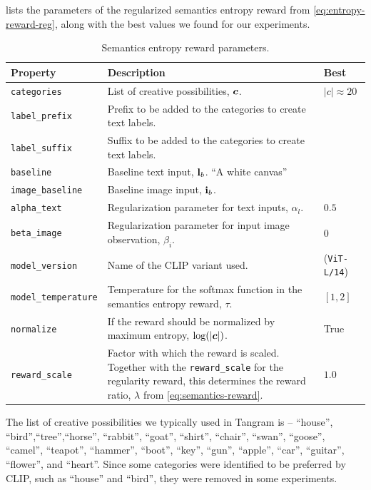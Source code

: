  lists the parameters of the regularized semantics entropy reward from \eqref{eq:entropy-reward-reg}, along with the best values we found for our experiments.
\begin{table}[H]
    \centering
    \caption{Semantics entropy reward parameters.}
    \begin{tabularx}{\textwidth}{C{3.9cm} L C{2cm}}
        \hline
        Property & Description & Best\\
        \hline
        \texttt{categories} & List of creative possibilities, \(\bm{c}\). & \(|c| \approx 20\)\\
        \texttt{label\_prefix} & Prefix to be added to the categories to create text labels.\\
        \texttt{label\_suffix} & Suffix to be added to the categories to create text labels.\\
        \texttt{baseline} & Baseline text input, \(\mathbf{l}_b\). ``A white canvas''\\
        \texttt{image\_baseline} & Baseline image input, \(\mathbf{i}_b\).\\
        \texttt{alpha\_text} & Regularization parameter for text inputs, \(\alpha_{l}\). & \(0.5\)\footnotemark[1]\\
        \texttt{beta\_image} & Regularization parameter for input image observation, \(\beta_{i}\). & \(0\)\footnotemark[1]\\
        \texttt{model\_version} & Name of the CLIP variant used. & (\texttt{ViT-L/14})\\
        \texttt{model\_temperature} & Temperature for the softmax function in the semantics entropy reward, \(\tau\). & \([1, 2]\)\\
        \texttt{normalize} & If the reward should be normalized by maximum entropy, \(\log(|\bm{c}|)\). & True\\
        \texttt{reward\_scale} & Factor with which the reward is scaled. Together with the \texttt{reward\_scale} for the regularity reward, this determines the reward ratio, \(\lambda\) from \eqref{eq:semantics-reward}. & \(1.0\)\\
        \hline
    \end{tabularx}
    \label{tab:entropy-reward-params}
\end{table}

The list of creative possibilities we typically used in Tangram is -- ``house'', ``bird'',``tree'',``horse'', ``rabbit'', ``goat'', ``shirt'', ``chair'', ``swan'', ``goose'', ``camel'', ``teapot'', ``hammer'', ``boot'', ``key'', ``gun'', ``apple'', ``car'', ``guitar'', ``flower'', and ``heart''.
Since some categories were identified to be preferred by CLIP, such as ``house'' and ``bird'', they were removed in some experiments.

